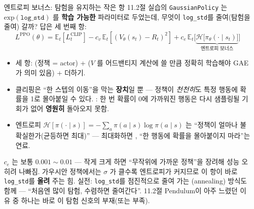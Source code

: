 \documentclass[aspectratio=169,11pt]{beamer}
\begin{document}
\begin{frame}{엔트로피 보너스: 탐험을 유지하는 작은 항}
  \small
  11.2절 실습의 \texttt{GaussianPolicy} 는
  $\mathrm{exp}(\texttt{log\_std})$ 를 \textbf{학습 가능한}
  파라미터로 두었는데, 무엇이 \texttt{log\_std}를 줄여(탐험을
  줄여) 갈까? 답은 세 번째 항:
  \[
  L^{\mathrm{PPO}}(\theta) = \mathbb{E}_t[L^{\mathrm{CLIP}}_t]
  - c_v\,\mathbb{E}_t[(V_\theta(s_t)-R_t)^2]
  + c_e\,\mathbb{E}_t\Big[\underbrace{
  \mathcal{H}\big[\pi_\theta(\cdot\mid s_t)\big]}_{\text{엔트로피
  보너스}}\Big]
  \]
  \begin{itemize}
    \item 세 항: (정책 = actor) +
      ($V$ 를 어드밴티지 계산에 쓸 만큼
      정확히 학습해야 GAE가 의미 있음) + 
      더하기.
    \item 클리핑은 ``한 스텝의 이동''을 막는 \textbf{장치}일 뿐 —
      정책이 \textit{천천히}도 특정 행동에 확률을 1로 몰아붙일
      수 있다. : 한 번
      확률이 0에 가까워진 행동은 다시 샘플링될 기회가 없어
      \textbf{영원히} 돌아오지 못함.
    \item 엔트로피 $\mathcal{H}[\pi(\cdot\mid s)]
      = -\sum_a \pi(a\mid s)\log\pi(a\mid s)$ 는 ``정책이
      얼마나 불확실한가(균등하면 최대)'' — 최대화하면
      ,
      ``한 행동에 확률을 몰아붙이지 마라''는 연료.
  \end{itemize}
  \begin{block}{$c_e$ 는 보통 $0.001\sim0.01$ — 작게}
    크게 하면 ``무작위에 가까운 정책''을 장려해 성능 오히려
    나빠짐. 가우시안 정책에서는 $\sigma$ 가 클수록 엔트로피가
    커지므로 이 항이 바로 \texttt{log\_std}를 \textbf{올려}
    주는 힘. 실전: \texttt{log\_std}를 점진적으로 줄여 가는
    (annealing) 방식도 함께 — ``처음엔 많이 탐험, 수렴하면
    줄여간다''. 11.2절 Pendulum이 아주 느렸던 이유 중 하나는
    바로 이 탐험 신호의 부재(또는 부족).
  \end{block}
\end{frame}
\end{document}
